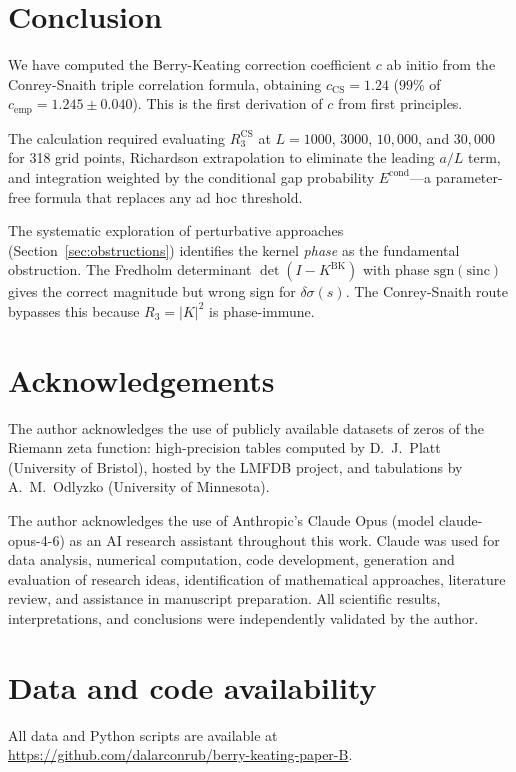 \documentclass[11pt]{article}
\begin{document}
\section{Conclusion}

We have computed the Berry-Keating correction coefficient $c$ ab initio from
the Conrey-Snaith triple correlation formula, obtaining
$c_{\mathrm{CS}} = 1.24$ ($99\%$ of $c_{\mathrm{emp}} = 1.245 \pm 0.040$).
This is the first derivation of $c$ from first principles.

The calculation required evaluating $R_3^{\mathrm{CS}}$ at $L = 1000$,
$3000$, $10{,}000$, and $30{,}000$ for 318 grid points, Richardson extrapolation
to eliminate the leading $a/L$ term, and integration weighted by the
conditional gap probability $E^{\mathrm{cond}}$---a parameter-free formula
that replaces any ad hoc threshold.

The systematic exploration of perturbative approaches
(Section~\ref{sec:obstructions}) identifies the kernel \emph{phase} as
the fundamental obstruction. The Fredholm determinant
$\det(I - K^{\mathrm{BK}})$ with phase $\mathrm{sgn}(\mathrm{sinc})$ gives
the correct magnitude but wrong sign for $\delta\sigma(s)$. The
Conrey-Snaith route bypasses this because $R_3 = |K|^2$ is phase-immune.


\section*{Acknowledgements}

The author acknowledges the use of publicly available datasets of zeros
of the Riemann zeta function: high-precision tables computed by
D.~J.~Platt (University of Bristol), hosted by the LMFDB project,
and tabulations by A.~M.~Odlyzko (University of Minnesota).

The author acknowledges the use of Anthropic's Claude Opus
(model claude-opus-4-6) as an AI research assistant throughout this work.
Claude was used for data analysis, numerical computation, code development,
generation and evaluation of research ideas, identification of mathematical
approaches, literature review, and assistance in manuscript preparation.
All scientific results, interpretations, and conclusions were independently
validated by the author.

\section*{Data and code availability}

All data and Python scripts are available at
\url{https://github.com/dalarconrub/berry-keating-paper-B}.




\end{document}
